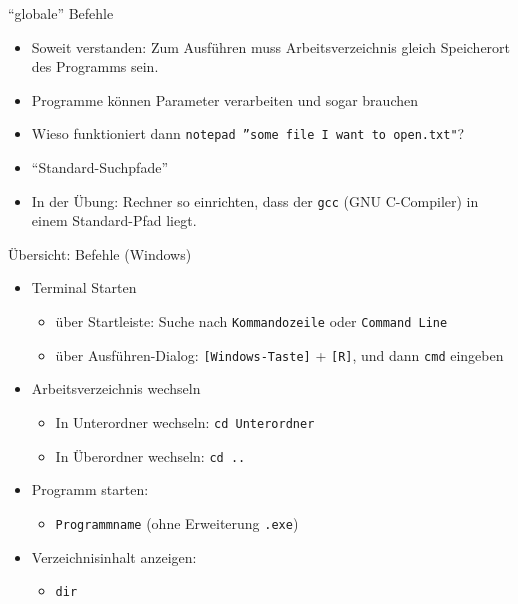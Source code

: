 \begin{frame}{\enquote{globale} Befehle}
%
\begin{itemize}
\item Soweit verstanden: Zum Ausführen muss Arbeitsverzeichnis gleich Speicherort des Programms sein.
\item Programme können Parameter verarbeiten und sogar brauchen
\item Wieso funktioniert dann \texttt{notepad ''some file I want to open.txt"}?
\item[\Thus] \enquote{Standard-Suchpfade}
\item[\Thus] In der Übung: Rechner so einrichten, dass der \texttt{gcc} (GNU C-Compiler) in einem Standard-Pfad liegt.
\end{itemize}
%
\end{frame}


\begin{frame}{Übersicht: Befehle (Windows)}
\begin{itemize}
\item Terminal Starten
	\begin{itemize}
	\item über Startleiste: Suche nach \texttt{Kommandozeile} oder \texttt{Command Line}
	\item über Ausführen-Dialog: \texttt{[Windows-Taste]} + \texttt{[R]}, und dann \texttt{cmd} eingeben
	\end{itemize}
\item Arbeitsverzeichnis wechseln
	\begin{itemize}
	\item In Unterordner wechseln: \texttt{cd Unterordner}
	\item In Überordner wechseln: \texttt{cd ..}
	\end{itemize}
\item Programm starten:
	\begin{itemize}
	\item \texttt{Programmname} (ohne Erweiterung \texttt{.exe})
	\end{itemize}
\item Verzeichnisinhalt anzeigen:
	\begin{itemize}
	\item \texttt{dir}
	\end{itemize}
\end{itemize}
\end{frame}

